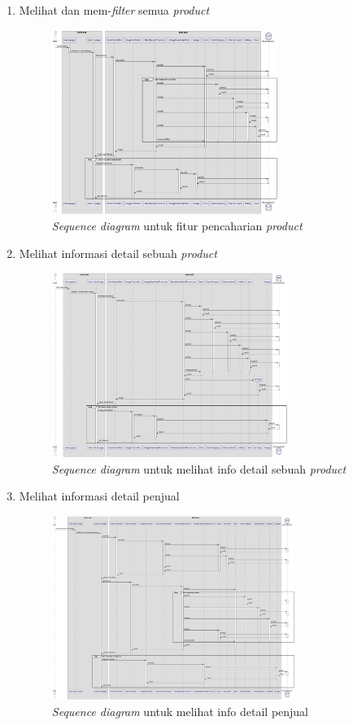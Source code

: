 \documentclass[a4paper]{article}
\begin{document}
\begin{enumerate}
\begin{enumerate}
        \item Melihat dan mem-\textit{filter} semua \textit{product}
        \begin{figure}[h]
            \centering
            \includegraphics*[height=6cm]{./diagram/sequence diagram/9. search item/search item.png}
            \caption{\textit{Sequence diagram} untuk fitur pencaharian \textit{product}}
        \end{figure}
        \item Melihat informasi detail sebuah \textit{product}
        \begin{figure}[h]
            \centering
            \includegraphics*[height=6cm]{./diagram/sequence diagram/10. see item detail/see item detail.png}
            \caption{\textit{Sequence diagram} untuk melihat info detail sebuah \textit{product}}
        \end{figure}
        \newpage

        \item Melihat informasi detail penjual
        \begin{figure}[h]
            \centering
            \includegraphics*[height=6cm]{./diagram/sequence diagram/11.view merchant page/view merchant page.png}
            \caption{\textit{Sequence diagram} untuk melihat info detail penjual}
        \end{figure}


\end{enumerate}
\end{enumerate}
\end{document}
